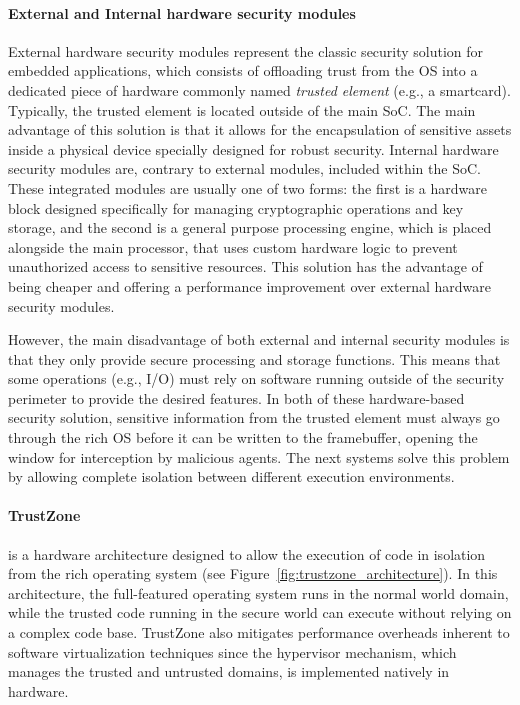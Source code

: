 \paragraph{\textbf{External and Internal hardware security modules}} External hardware security modules represent the classic security solution for embedded applications, which consists of offloading trust from the OS into a dedicated piece of hardware commonly named \emph{trusted element} (e.g., a smartcard). Typically, the trusted element is located outside of the main \ac{SoC}. The main advantage of this solution is that it allows for the encapsulation of sensitive assets inside a physical device specially designed for robust security. Internal hardware security modules are, contrary to external modules, included within the \ac{SoC}. These integrated modules are usually one of two forms: the first is a hardware block designed specifically for managing cryptographic operations and key storage, and the second is a general purpose processing engine, which is placed alongside the main processor, that uses custom hardware logic to prevent unauthorized access to sensitive resources. This solution has the advantage of being cheaper and offering a performance improvement over external hardware security modules.

However, the main disadvantage of both external and internal security modules is that they only provide secure processing and storage functions. This means that some operations (e.g., I/O) must rely on software running outside of the security perimeter to provide the desired features. In both of these hardware-based security solution, sensitive information from the trusted element must always go through the rich OS before it can be written to the framebuffer, opening the window for interception by malicious agents. The next systems solve this problem by allowing complete isolation between different execution environments.

\paragraph{\textbf{TrustZone}} is a hardware architecture designed to allow the execution of code in isolation from the rich operating system (see Figure~\ref{fig:trustzone_architecture}). In this architecture, the full-featured operating system runs in the normal world domain, while the trusted code running in the secure world can execute without relying on a complex code base. TrustZone also mitigates performance overheads inherent to software virtualization techniques since the hypervisor mechanism, which manages the trusted and untrusted domains, is implemented natively in hardware.

